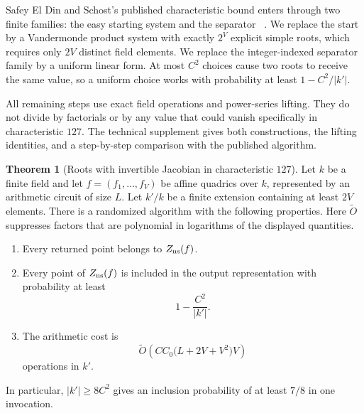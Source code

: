 \documentclass[11pt,a4paper]{article}
\theoremstyle{definition}
\newtheorem{theorem}{Theorem}[section]
\theoremstyle{remark}
\newcommand{\softO}{\widetilde O}
\begin{document}
Safey El Din and Schost's published characteristic bound enters through two
finite families: the easy starting system and the separator
~\cite{SafeySchost2018}.  We replace the start by a Vandermonde product system
with exactly $2^V$ explicit simple roots, which requires only $2V$ distinct
field elements.  We replace the integer-indexed separator family by a uniform
linear form.  At most $C^2$ choices cause two roots to receive the same value,
so a uniform choice works with probability at least $1-C^2/|k'|$.

All remaining steps use exact field operations and power-series lifting.  They
do not divide by factorials or by any value that could vanish specifically in
characteristic $127$.  The technical supplement gives both constructions,
the lifting identities, and a step-by-step comparison with the published
algorithm.

\begin{theorem}[Roots with invertible Jacobian in characteristic $127$]\label{thm:finite-char-nonsingular}
Let $k$ be a finite field and let $f=(f_1,\ldots,f_V)$ be affine quadrics over
$k$, represented by an arithmetic circuit of size $L$.  Let $k'/k$ be a
finite extension containing at least $2V$ elements.  There is a randomized
algorithm with the following properties.
Here $\widetilde O$ suppresses factors that are polynomial in logarithms of
the displayed quantities.

\begin{enumerate}
\item Every returned point belongs to $Z_{\rm ns}(f)$.
\item Every point of $Z_{\rm ns}(f)$ is included in the output representation
with probability at least
\begin{equation}\label{eq:finite-char-success}
 1-\frac{C^2}{|k'|}.
\end{equation}
\item The arithmetic cost is
\begin{equation}\label{eq:published-slp-specialization}
 \softO\!\left(
 C C_0\bigl(L+2V+V^2\bigr)V
 \right)
\end{equation}
operations in $k'$.
\end{enumerate}
In particular, $|k'|\ge8C^2$ gives an inclusion probability of at least $7/8$
in one invocation.
\end{theorem}
\end{document}
